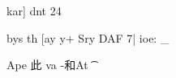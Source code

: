 \documentclass[UTF8,12pt,a4paper,openany]{ctexbook}
\begin{document}
\begin{enumerate}[label=\textbf{\arabic*.},leftmargin=2em]
 kar]  dnt 24\par bys th [ay y+ Sry DAF 7| ioe:    \_\par Ape 此     va -和At \t
\end{enumerate}
\end{document}
